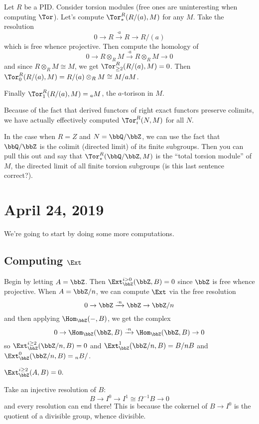 \documentclass[12pt]{article}
\begin{document}
\begin{ex}
	Let $R$ be a PID. Consider torsion modules (free ones are uninteresting when computing $\Tor$).
	Let's compute $\Tor_\ast^R(R/(a),M)$ for any $M$. Take the resolution
	\[0\to R\xrightarrow{\cdot a} R\to R/(a)\]
	which is free whence projective. Then compute the homology of
	\[0\to R\otimes_R M\xrightarrow{\cdot a} R\otimes_RM\to 0\]
	and since $R\otimes_RM\cong M$, we get $\Tor_{\ge 2}^R(R/(a),M)=0$. Then $\Tor_0^R(R/(a),M)=R/(a)\otimes_R M\cong M/aM$.

	Finally $\Tor_1^R(R/(a),M)={_a}M$, the $a$-torison in $M$.
\end{ex}
\begin{rmk}
	Because of the fact that derived functors of right exact functors preserve colimits, we have actually effectively computed
	$\Tor_i^R(N,M)$ for all $N$.
\end{rmk}
\begin{ex}
	In the case when $R=Z$ and $N=\bbQ/\bbZ$, we can use the fact that $\bbQ/\bbZ$ is the colimit (directed limit)
	of its finite subgroups. Then you can pull this out and say that $\Tor_*^R(\bbQ/\bbZ,M)$ is the ``total torsion module'' of $M$,
	the directed limit of all finite torsion subgroups (is this last sentence correct?).
\end{ex}

\section{April 24, 2019}
We're going to start by doing some more computations.
\subsection{Computing $\Ext$}
Begin by letting $A=\bbZ$. Then $\Ext_\bbZ^{i>0}(\bbZ,B)=0$ since $\bbZ$ is free whence projective.
When $A=\bbZ/n$, we can compute $\Ext$ via the free resolution
\[0\to \bbZ\xrightarrow{\cdot n}\bbZ\to \bbZ/n\]
and then applying $\Hom_\bbZ(-,B)$, we get the complex 
\[0\to \Hom_\bbZ(\bbZ,B)\xrightarrow{\cdot n}\Hom_\bbZ(\bbZ,B)\to 0\]
so $\Ext_\bbZ^{i\ge 2}(\bbZ/n,B)=0$ and $\Ext_\bbZ^1(\bbZ/n,B)=B/nB$ and $\Ext_\bbZ^0(\bbZ/n,B)={_n}B/$.

\begin{thm}
	$\Ext_{\bbZ}^{i\ge 2}(A,B)=0.$
\end{thm}
\begin{prf}
	Take an injective resolution of $B$:
	\[B\to I^0\to I^1\cong\Omega^{-1}B\to 0\]
	and every resolution can end there! This is because the cokernel of $B\to I^0$ is the 
	quotient of a divisible group, whence divisible.
\end{prf}
\end{document}
